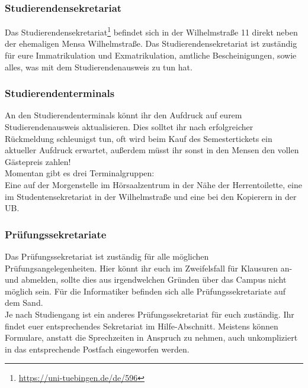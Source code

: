 \subsubsection*{Studierendensekretariat}
Das Studierendensekretariat\footnote{\url{https://uni-tuebingen.de/de/596}} befindet sich in der Wilhelmstraße 11 direkt neben der ehemaligen Mensa Wilhelmstraße. Das Studierendensekretariat ist zuständig für eure Immatrikulation und Exmatrikulation, amtliche Bescheinigungen, sowie alles, was mit dem Studierendenausweis zu tun hat.	%

\subsubsection*{Studierendenterminals}
An den Studierendenterminals könnt ihr den Aufdruck auf eurem
Studierendenausweis aktualisieren. Dies solltet ihr nach erfolgreicher Rückmeldung schleunigst tun, oft wird beim Kauf des Semestertickets ein aktueller Aufdruck erwartet, außerdem müsst ihr sonst in den Mensen
den vollen Gästepreis zahlen!\\
Momentan gibt es drei Terminalgruppen:\\
Eine auf der Morgenstelle im Hörsaalzentrum in der Nähe der Herrentoilette,
eine im Studentensekretariat in der Wilhelmstraße und eine bei den Kopierern in der UB.

\subsubsection*{Prüfungssekretariate}
Das Prüfungssekretariat ist zuständig für alle möglichen Prüfungsangelegenheiten. Hier könnt ihr euch im Zweifelsfall für Klausuren an- und abmelden, sollte dies aus irgendwelchen Gründen über das Campus nicht möglich sein. Für die Informatiker befinden sich alle Prüfungssekretariate auf dem Sand.\\
Je nach Studiengang ist ein anderes Prüfungssekretariat für euch zuständig. Ihr findet euer entsprechendes Sekretariat im Hilfe-Abschnitt. Meistens können Formulare, anstatt die Sprechzeiten in Anspruch zu nehmen, auch unkompliziert in das entsprechende Postfach eingeworfen werden.

\vfill \pagebreak 
